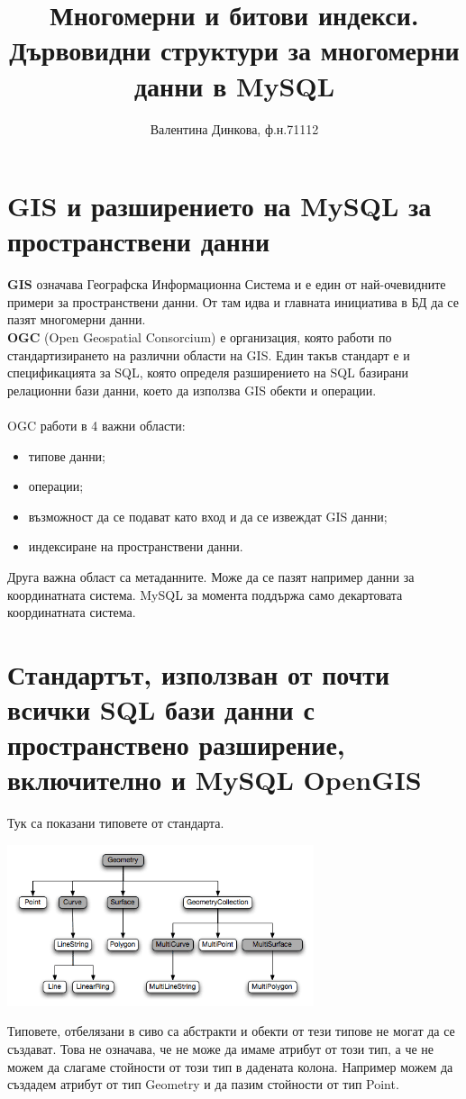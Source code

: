 \documentclass[a4paper,10pt]{article}
\title{Многомерни и битови индекси. Дървовидни структури за многомерни данни в MySQL}
\author{Валентина Динкова, ф.н.71112}
\begin{document}
\maketitle

\newpage
\section{GIS и разширението на MySQL за пространствени данни}
\textbf{GIS} означава Географска Информационна Система и е един от най-очевидните примери за пространствени данни.
От там идва и главната инициатива в БД да се пазят многомерни данни.
\\
\textbf{OGC} (Open Geospatial Consorcium) е организация, която работи по стандартизирането на различни области на GIS.
Един такъв стандарт е и спецификацията за SQL, която определя разширението на SQL базирани релационни бази данни,
 което да използва GIS обекти и операции.
\\
\\
 OGC работи в 4 важни области:
\begin{itemize}
 \item типове данни;
 \item операции;
 \item възможност да се подават като вход и да се извеждат GIS данни;
 \item индексиране на пространствени данни.
\end{itemize}
Друга важна област са метаданните. Може да се пазят например данни за координатната система. MySQL за момента поддържа само 
декартовата координатната система.
\\
\section{Стандартът, използван от почти всички SQL бази данни с пространствено разширение, включително и MySQL OpenGIS}
Тук са показани типовете от стандарта.
\begin{center}
\includegraphics[width=90mm]{gis-datatypes.png}\end{center}
Типовете, отбелязани в сиво са абстракти и обекти от тези типове не могат да се създават. Това не означава, че не може да 
имаме атрибут от този тип, а че не можем да слагаме стойности от този тип в дадената колона. Например можем да 
създадем атрибут от тип Geometry и да пазим стойности от тип Point.
\end{document}
